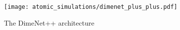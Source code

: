 \begin{figure}[H]
  \centering
\texttt{[image: atomic\_simulations/dimenet\_plus\_plus.pdf]}
\caption{The DimeNet++ architecture \cite*{https://doi.org/10.48550/arxiv.2203.09697}}
\label{fig:one}
\end{figure}

